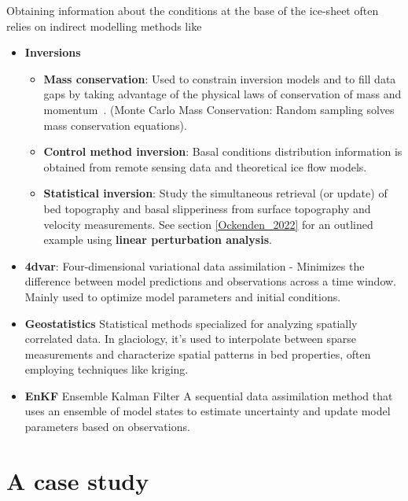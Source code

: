 Obtaining information about the conditions at the base of the ice-sheet often relies on indirect modelling methods like
\begin{itemize}

    \item\textbf{Inversions}
        \begin{itemize}
            \item\textbf{Mass conservation}: Used to constrain inversion models and to fill data gaps by taking advantage of the physical laws of conservation of mass and momentum~\cite{Morlighem_2017, Morlighem_2020}. (Monte Carlo Mass Conservation: Random sampling solves mass conservation equations\cite{Brinkerhoff_2016}).
            \item\textbf{Control method inversion}: Basal conditions distribution information is obtained from remote sensing data and theoretical ice flow models\cite{deRydt_2013}.
            \item\textbf{Statistical inversion}: Study the simultaneous retrieval (or update) of bed topography and basal slipperiness from surface topography and velocity measurements\cite{deRydt_2013}. See section \ref{Ockenden_2022} for an outlined example using \textbf{linear perturbation analysis}.
        \end{itemize}

    \item\textbf{4dvar}: Four-dimensional variational data assimilation - Minimizes the difference between model predictions and observations across a time window. Mainly used to optimize model parameters and initial conditions\cite{Morlighem_Goldberg_2024}.

    \item\textbf{Geostatistics} Statistical methods specialized for analyzing spatially correlated data. In glaciology, it's used to interpolate between sparse measurements and characterize spatial patterns in bed properties, often employing techniques like kriging\cite{Mackie_2020}.

    \item\textbf{EnKF} Ensemble Kalman Filter A sequential data assimilation method that uses an ensemble of model states to estimate uncertainty and update model parameters based on observations\cite{Morlighem_Goldberg_2024}.

\end{itemize} 

\section{A case study}\label{Castleman_2022}
